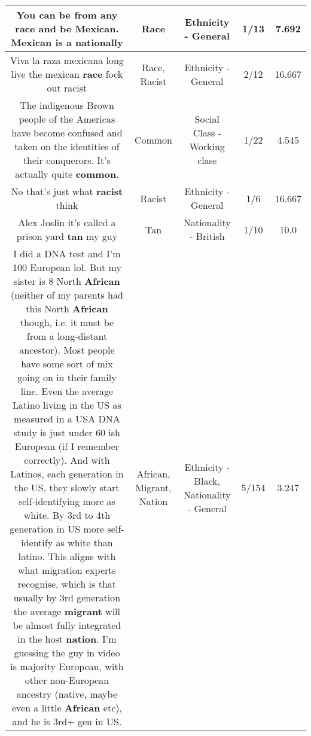 \documentclass[11pt]{article}
\newlength\mylength
\begin{document}
\begin{center}
\begin{longtable}{|C{.65\mylength}|C{.30\mylength}|C{.12\mylength}|C{.12\mylength}|C{.12\mylength}|}
  \small You can be from any \textbf{race} and be Mexican. Mexican is a nationally\normalsize   & Race & Ethnicity - General & 1/13 & 7.692 \\  \hline
  \small Viva la raza mexicana long live the mexican \textbf{race} fock out racist\normalsize   & Race, Racist & Ethnicity - General & 2/12 & 16.667 \\  \hline
  \small The indigenous Brown people of the Americas have become confused and taken on the identities of their conquerors. It's actually quite \textbf{common}.\normalsize   & Common & Social Class - Working class & 1/22 & 4.545 \\  \hline
  \small No that's just what \textbf{racist} think\normalsize   & Racist & Ethnicity - General & 1/6 & 16.667 \\  \hline
  \small Alex Joslin it's called a prison yard \textbf{tan} my guy\normalsize   & Tan & Nationality - British & 1/10 & 10.0 \\  \hline
  \small I did a DNA test and I'm 100 European lol.  But my sister is 8 North \textbf{African} (neither of my parents had this North \textbf{African} though, i.e. it must be from a long-distant ancestor).  Most people have some sort of mix going on in their family line.  Even the average Latino living in the US as measured in a USA DNA study is just under 60 ish  European (if I remember correctly).  And with Latinos, each generation in the US, they slowly start self-identifying more as white.  By 3rd to 4th generation in US more self-identify as white than latino.  This aligns with what migration experts recognise, which is that usually by 3rd generation the average \textbf{migrant} will be almost fully integrated in the host \textbf{nation}.  I'm guessing the guy in video is majority European, with other non-European ancestry (native, maybe even a little \textbf{African} etc), and he is 3rd+ gen in US.\normalsize   & African, Migrant, Nation & Ethnicity - Black, Nationality - General & 5/154 & 3.247 \\  \hline

\end{longtable}
\end{center}
\end{document}
